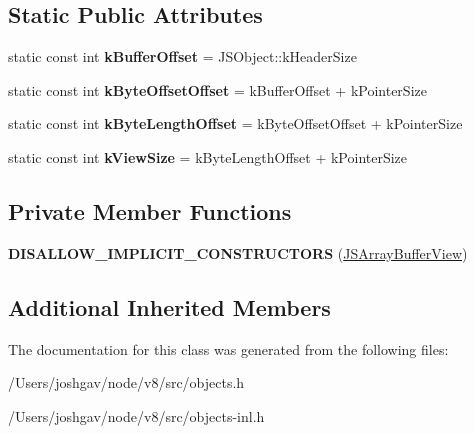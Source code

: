 \subsection*{Static Public Attributes}
\begin{DoxyCompactItemize}
\item 
static const int {\bfseries k\+Buffer\+Offset} = J\+S\+Object\+::k\+Header\+Size\hypertarget{classv8_1_1internal_1_1_j_s_array_buffer_view_a9bd38062f57df90d780be9f6b4ff6279}{}\label{classv8_1_1internal_1_1_j_s_array_buffer_view_a9bd38062f57df90d780be9f6b4ff6279}

\item 
static const int {\bfseries k\+Byte\+Offset\+Offset} = k\+Buffer\+Offset + k\+Pointer\+Size\hypertarget{classv8_1_1internal_1_1_j_s_array_buffer_view_a0cab5381d9130dc8f3fd3241b1895b9c}{}\label{classv8_1_1internal_1_1_j_s_array_buffer_view_a0cab5381d9130dc8f3fd3241b1895b9c}

\item 
static const int {\bfseries k\+Byte\+Length\+Offset} = k\+Byte\+Offset\+Offset + k\+Pointer\+Size\hypertarget{classv8_1_1internal_1_1_j_s_array_buffer_view_a51ff86f5799df5e2dbdf3de80a23d951}{}\label{classv8_1_1internal_1_1_j_s_array_buffer_view_a51ff86f5799df5e2dbdf3de80a23d951}

\item 
static const int {\bfseries k\+View\+Size} = k\+Byte\+Length\+Offset + k\+Pointer\+Size\hypertarget{classv8_1_1internal_1_1_j_s_array_buffer_view_aa87af2114ca0ff678a62bcc5bbc2717e}{}\label{classv8_1_1internal_1_1_j_s_array_buffer_view_aa87af2114ca0ff678a62bcc5bbc2717e}

\end{DoxyCompactItemize}
\subsection*{Private Member Functions}
\begin{DoxyCompactItemize}
\item 
{\bfseries D\+I\+S\+A\+L\+L\+O\+W\+\_\+\+I\+M\+P\+L\+I\+C\+I\+T\+\_\+\+C\+O\+N\+S\+T\+R\+U\+C\+T\+O\+RS} (\hyperlink{classv8_1_1internal_1_1_j_s_array_buffer_view}{J\+S\+Array\+Buffer\+View})\hypertarget{classv8_1_1internal_1_1_j_s_array_buffer_view_a30bd58e61b977688787b5d7a15d49f78}{}\label{classv8_1_1internal_1_1_j_s_array_buffer_view_a30bd58e61b977688787b5d7a15d49f78}

\end{DoxyCompactItemize}
\subsection*{Additional Inherited Members}


The documentation for this class was generated from the following files\+:\begin{DoxyCompactItemize}
\item 
/\+Users/joshgav/node/v8/src/objects.\+h\item 
/\+Users/joshgav/node/v8/src/objects-\/inl.\+h\end{DoxyCompactItemize}
